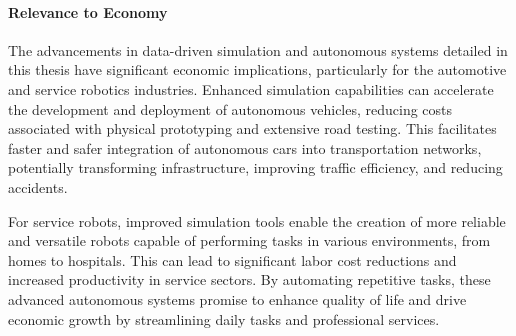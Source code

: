 \paragraph{Relevance to Economy}
The advancements in data-driven simulation and autonomous systems detailed in this thesis have significant economic implications, particularly for the automotive and service robotics industries. Enhanced simulation capabilities can accelerate the development and deployment of autonomous vehicles, reducing costs associated with physical prototyping and extensive road testing. This facilitates faster and safer integration of autonomous cars into transportation networks, potentially transforming infrastructure, improving traffic efficiency, and reducing accidents.

For service robots, improved simulation tools enable the creation of more reliable and versatile robots capable of performing tasks in various environments, from homes to hospitals. This can lead to significant labor cost reductions and increased productivity in service sectors. By automating repetitive tasks, these advanced autonomous systems promise to enhance quality of life and drive economic growth by streamlining daily tasks and professional services.